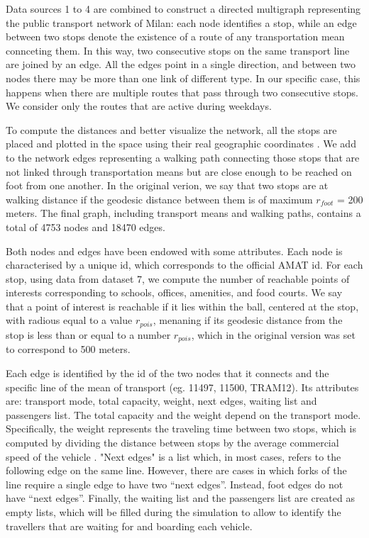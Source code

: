 Data sources 1 to 4 are combined to construct a directed multigraph representing the public transport network of Milan: each node identifies a stop, while an edge between two stops denote the existence of a route of any transportation mean connceting them. In this way, two consecutive stops on the same transport line are joined by an edge. All the edges point in a single direction, and between two nodes there may be more than one link of different type. In our specific case, this happens when there are multiple routes that pass through two consecutive stops. We consider only the routes that are active during weekdays.

To compute the distances and better visualize the network, all the stops are placed and plotted in the space using their real geographic coordinates \cite{site2,site6}.  
We add to the network edges representing a walking path connecting those stops that are not linked through transportation means but are close enough to be reached on foot from one another. In the original verion, we say that two stops are at walking distance if the geodesic distance between them is of maximum $r_{foot}$ = 200 meters. 
The final graph, including transport means and walking paths, contains a total of 4753 nodes and 18470 edges. 

Both nodes and edges have been endowed with some attributes.
Each node is characterised by a unique id, which corresponds to the official AMAT id. For each stop, using data from dataset 7, we compute the number of reachable points of interests corresponding to schools, offices, amenities, and food courts. We say that a point of interest is reachable if it lies within the ball, centered at the stop, with radious equal to a value $r_{pois}$, menaning if its geodesic distance from the stop is less than or equal to a number $r_{pois}$, which in the original version was set to correspond to 500 meters.  
 
Each edge is identified by the id of the two nodes that it connects and the specific line of the mean of transport (eg. 11497, 11500, TRAM12). Its attributes are: transport mode, total capacity, weight, next edges, waiting list and passengers list. The total capacity \cite{site13,site14,site15,site16} and the weight depend on the transport mode. Specifically, the weight represents the traveling time between two stops, which is computed by dividing the distance between stops by the average commercial speed of the vehicle \cite{site17}. "Next edges" is a list which, in most cases, refers to the following edge on the same line. However, there are cases in which forks of the line require a single edge to have two “next edges”. Instead, foot edges do not have “next edges”. Finally, the waiting list and the passengers list are created as empty lists, which will be filled during the simulation to allow to identify the travellers that are waiting for and boarding each vehicle. 


